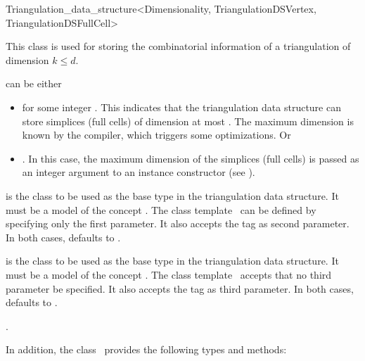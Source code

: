 \begin{ccRefClass}{Triangulation_data_structure<Dimensionality, TriangulationDSVertex, TriangulationDSFullCell>}

\ccDefinition 
This class is used for storing the combinatorial information of a triangulation
of dimension $k\leq d$.


\ccParameters

 can be either \begin{itemize}

\item \ccPureGlobalScope{} for some integer . This
indicates that the triangulation data structure can store simplices (full cells) of dimension at most
. The maximum dimension  is known by the compiler, which
triggers some optimizations. Or

\item \ccPureGlobalScope{}. In this case, the maximum
dimension of the simplices (full cells) is passed as an integer argument to an instance
constructor (see ).\end{itemize}

 is the class to be used as the base  type in the
triangulation data structure. It must be a model of the concept
. The class template \ccRefName\ can be
defined by specifying 
 only the first parameter. It also accepts the tag  as
second parameter. In both cases,  defaults to
.


 is the class to be used as the base  type in
the triangulation data structure. It must be a model of the concept
. The class template \ccRefName\ accepts that no
third parameter be specified. It also accepts the tag  as
third parameter. In both cases,  defaults to
.

\ccIsModel

.

In addition, the class \ccRefName\ provides the following types and methods:

\ccCreation
{}


\end{ccRefClass}
